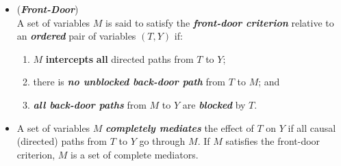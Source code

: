 \documentclass[11pt]{article}
\begin{document}
\begin{itemize}
\item \begin{definition} (\emph{\textbf{Front-Door}}) \citep{pearl2000causal}\\
A set of variables $M$ is said to satisfy the \emph{\textbf{front-door criterion}} relative to an \emph{\textbf{ordered}} pair of variables $(T, Y)$ if:
\begin{enumerate}
\item $M$ \textbf{intercepts} \textbf{all} directed paths from $T$ to $Y$;
\item there is \emph{\textbf{no unblocked back-door path}} from $T$ to $M$; and
\item \emph{\textbf{all back-door paths}} from $M$ to $Y$ are \emph{\textbf{blocked}} by $T$.
\end{enumerate}
\end{definition} 

\item  A set of variables $M$ \emph{\textbf{completely mediates}} the effect of $T$ on $Y$ if all causal (directed) paths from $T$ to $Y$ go through $M$. If $M$ satisfies the front-door criterion, $M$ is a set of complete mediators.


\end{itemize}
\end{document}
